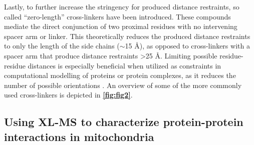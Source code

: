 Lastly, to further increase the stringency for produced distance restraints, so called “zero-length” cross-linkers have been introduced. These compounds mediate the direct conjunction of two proximal residues with no intervening spacer arm or linker. This theoretically reduces the produced distance restraints to only the length of the side chains ($\sim$15 Å), as opposed to cross-linkers with a spacer arm that produce distance restraints >25 Å. Limiting possible residue-residue distances is especially beneficial when utilized as constraints in computational modelling of proteins or protein complexes, as it reduces the number of possible orientations \cite{Leitner_2014}. An overview of some of the more commonly used cross-linkers is depicted in \textbf{\autoref{fig:fig2}}.

\subsection*{Using XL-MS to characterize protein-protein interactions in mitochondria}
